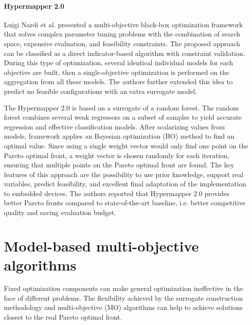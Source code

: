         \paragraph{Hypermapper 2.0} Luigi Nardi et al. \cite{nardi2019practical} presented a multi-objective black-box optimization framework that solves complex parameter tuning problems with the combination of search space, expensive evaluation, and feasibility constraints.
        The proposed approach can be classified as a direct indicator-based algorithm with constraint validation. During this type of optimization, several identical individual models for each objective are built, then a single-objective optimization is performed on the aggregation from all these models. The authors further extended this idea to predict no feasible configurations with an extra surrogate model.
        
        The Hypermapper 2.0 is based on a surrogate of a random forest. The random forest combines several weak regressors on a subset of samples to yield accurate regression and effective classification models. After scalarizing values from models, framework applies an Bayesian optimization (BO) method to find an optimal value. Since using a single weight vector would only find one point on the Pareto optimal front, a weight vector is chosen randomly for each iteration, ensuring that multiple points on the Pareto optimal front are found. The key features of this approach are the possibility to use prior knowledge, support real variables, predict feasibility, and excellent final adaptation of the implementation to embedded devices. The authors reported that Hypermapper 2.0 provides better Pareto fronts compared to state-of-the-art baseline, i.e. better competitive quality and saving evaluation budget.
        

    \section{Model-based multi-objective algorithms}
        Fixed optimization components can make general optimization ineffective in the face of different problems. The flexibility achieved by the surrogate construction methodology and multi-objective (MO) algorithms can help to achieve solutions closest to the real Pareto optimal front.

